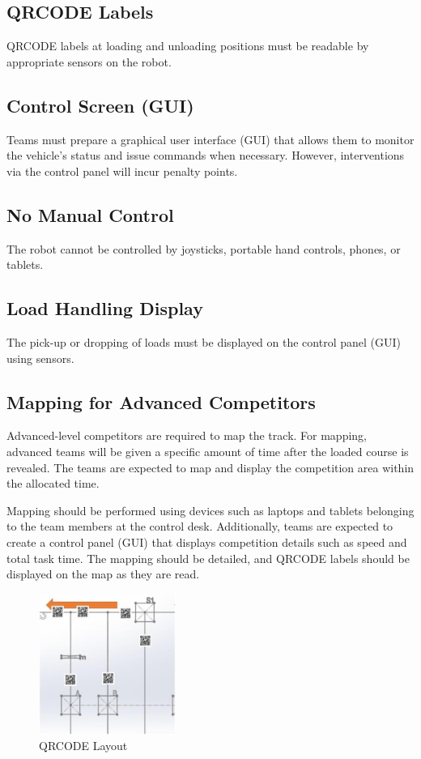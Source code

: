 \documentclass[../../main]{subfiles}
\begin{document}
\subsection{QRCODE Labels}
QRCODE labels at loading and unloading positions must be readable by appropriate sensors on the robot.

\subsection{Control Screen (GUI)}
Teams must prepare a graphical user interface (GUI) that allows them to monitor the vehicle’s status and issue commands when necessary. However, interventions via the control panel will incur penalty points.

\subsection{No Manual Control}
The robot cannot be controlled by joysticks, portable hand controls, phones, or tablets.

\subsection{Load Handling Display}
The pick-up or dropping of loads must be displayed on the control panel (GUI) using sensors.


\subsection{Mapping for Advanced Competitors}
Advanced-level competitors are required to map the track. For mapping, advanced teams will be given a specific amount of time after the loaded course is revealed. The teams are expected to map and display the competition area within the allocated time. 

Mapping should be performed using devices such as laptops and tablets belonging to the team members at the control desk. Additionally, teams are expected to create a control panel (GUI) that displays competition details such as speed and total task time. The mapping should be detailed, and QRCODE labels should be displayed on the map as they are read.
\begin{figure}[h!]
    \centering
    \includegraphics[width=0.4\textwidth]{img/qr.jpg}
    \caption{QRCODE Layout}
    \label{fig:tekno}
\end{figure}
\end{document}
